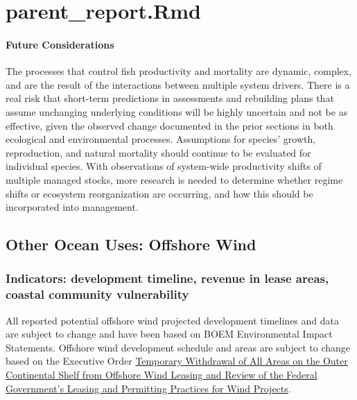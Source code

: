 \documentclass[
  10pt,
]{article}
\begin{document}
\section{parent\_report.Rmd}\label{parent_report.rmd-7}

\paragraph{Future Considerations}\label{future-considerations-2}

The processes that control fish productivity and mortality are dynamic, complex, and are the result of the interactions between multiple system drivers. There is a real risk that short-term predictions in assessments and rebuilding plans that assume unchanging underlying conditions will be highly uncertain and not be as effective, given the observed change documented in the prior sections in both ecological and environmental processes. Assumptions for species' growth, reproduction, and natural mortality should continue to be evaluated for individual species. With observations of system-wide productivity shifts of multiple managed stocks, more research is needed to determine whether regime shifts or ecosystem reorganization are occurring, and how this should be incorporated into management.

\subsection{Other Ocean Uses: Offshore Wind}\label{other-ocean-uses-offshore-wind}

\subsubsection{Indicators: development timeline, revenue in lease areas, coastal community vulnerability}\label{indicators-development-timeline-revenue-in-lease-areas-coastal-community-vulnerability}

All reported potential offshore wind projected development timelines and data are subject to change and have been based on BOEM Environmental Impact Statements. Offshore wind development schedule and areas are subject to change based on the Executive Order \href{https://www.whitehouse.gov/presidential-actions/2025/01/temporary-withdrawal-of-all-areas-on-the-outer-continental-shelf-from-offshore-wind-leasing-and-review-of-the-federal-governments-leasing-and-permitting-practices-for-wind-projects/}{Temporary Withdrawal of All Areas on the Outer Continental Shelf from Offshore Wind Leasing and Review of the Federal Government's Leasing and Permitting Practices for Wind Projects}.
\end{document}
